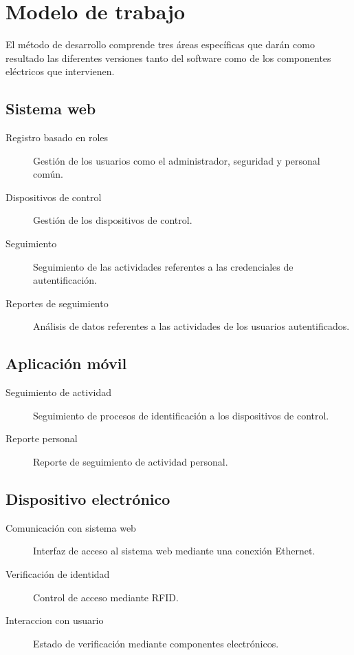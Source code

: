 \documentclass[11pt,twocolumn]{article}
\begin{document}
\section{Modelo de trabajo}  

El m\'etodo de desarrollo comprende tres \'areas espec\'ificas que dar\'an como resultado las diferentes versiones tanto del software como de los componentes el\'ectricos  que intervienen.


	\subsection{ Sistema web }
	
	\begin{description}
		\item [Registro basado en roles] Gesti\'on de los usuarios como el administrador, seguridad y personal com\'un.
		\item [Dispositivos de control] Gesti\'on de los dispositivos de control.
		\item [Seguimiento] Seguimiento de las actividades referentes a las credenciales de autentificaci\'on.
		\item [Reportes de seguimiento] An\'alisis de datos referentes a las actividades de los usuarios autentificados.
	\end{description}
	
	\subsection{Aplicaci\'on m\'ovil}		
	
	 \begin{description}
		 \item[Seguimiento de actividad] Seguimiento de procesos de identificaci\'on a los dispositivos de control.
		 \item[Reporte personal] Reporte de seguimiento de actividad personal.
	 \end{description}
	
	\subsection{Dispositivo electr\'onico}
	
	 \begin{description}
		 \item[Comunicaci\'on con sistema web] Interfaz de acceso al sistema web mediante una conexi\'on Ethernet.
		 \item[Verificaci\'on de identidad] Control de acceso mediante RFID.
		 \item[Interaccion con usuario] Estado de verificaci\'on mediante componentes electr\'onicos. 		
	 \end{description}			
\end{document}
